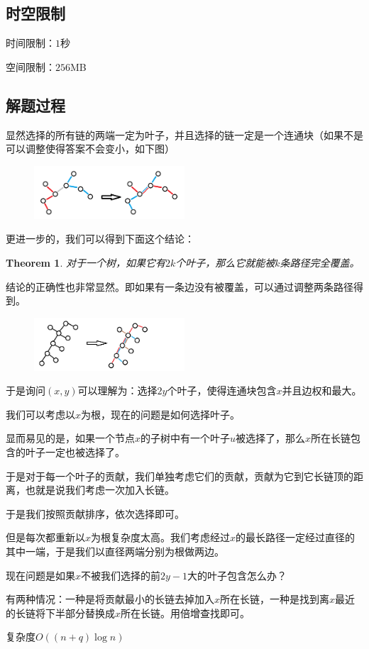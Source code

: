 \documentclass[12pt]{article}
\newtheorem{theorem}{Theorem}
\begin{document}
\subsection{时空限制}
时间限制：$1$秒

空间限制：$256$MB
\subsection{解题过程}
显然选择的所有链的两端一定为叶子，并且选择的链一定是一个连通块（如果不是可以调整使得答案不会变小，如下图）
\begin{figure}[h] %
    \centering %
    \includegraphics[width=0.5\textwidth]{p1.png} %
    \label{p1} %
\end{figure}%
更进一步的，我们可以得到下面这个结论：
\begin{theorem}
  对于一个树，如果它有$2k$个叶子，那么它就能被$k$条路径完全覆盖。
\end{theorem}

结论的正确性也非常显然。即如果有一条边没有被覆盖，可以通过调整两条路径得到。
\begin{figure}[h]
  \centering
  \includegraphics[width=0.5\textwidth]{p2.png}
  \label{p2}
\end{figure}

于是询问$(x,y)$可以理解为：选择$2y$个叶子，使得连通块包含$x$并且边权和最大。

我们可以考虑以$x$为根，现在的问题是如何选择叶子。

显而易见的是，如果一个节点$x$的子树中有一个叶子$u$被选择了，那么$x$所在长链包含的叶子一定也被选择了。

于是对于每一个叶子的贡献，我们单独考虑它们的贡献，贡献为它到它长链顶的距离，也就是说我们考虑一次加入长链。

于是我们按照贡献排序，依次选择即可。

但是每次都重新以$x$为根复杂度太高。我们考虑经过$x$的最长路径一定经过直径的其中一端，于是我们以直径两端分别为根做两边。

现在问题是如果$x$不被我们选择的前$2y-1$大的叶子包含怎么办？

有两种情况：一种是将贡献最小的长链去掉加入$x$所在长链，一种是找到离$x$最近的长链将下半部分替换成$x$所在长链。用倍增查找即可。

复杂度$O((n+q)\log n)$

\newpage
\end{document}
